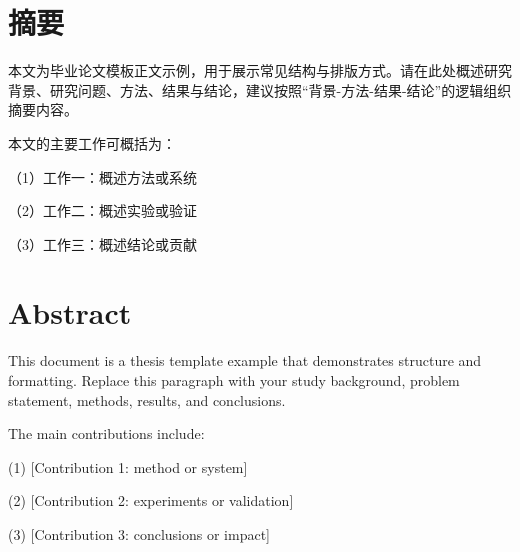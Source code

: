 \documentclass[unicode,master,submission,final]{scutthesis}
\begin{document}
\maketitle
\frontmatter
\ifmaincontent\else

\chapter{摘\texorpdfstring{\quad}{}要}

本文为毕业论文模板正文示例，用于展示常见结构与排版方式。请在此处概述研究背景、研究问题、方法、结果与结论，建议按照“背景-方法-结果-结论”的逻辑组织摘要内容。

本文的主要工作可概括为：

（1）工作一：概述方法或系统

（2）工作二：概述实验或验证

（3）工作三：概述结论或贡献


\chapter{Abstract}

This document is a thesis template example that demonstrates structure and formatting. Replace this paragraph with your study background, problem statement, methods, results, and conclusions.

The main contributions include:

(1) [Contribution 1: method or system]

(2) [Contribution 2: experiments or validation]

(3) [Contribution 3: conclusions or impact]


\tableofcontents
\fi

\mainmatter

\pagestyle{fancy}

\end{document}
